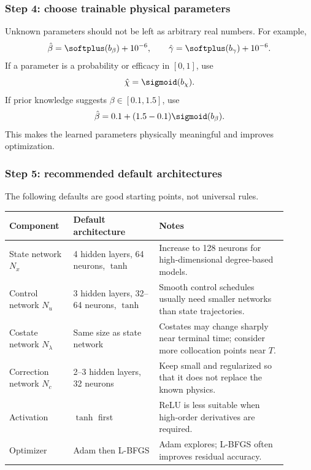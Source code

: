 \documentclass[11pt,a4paper]{article}
\begin{document}
\subsubsection*{Step 4: choose trainable physical parameters}
Unknown parameters should not be left as arbitrary real numbers. For example,
\begin{equation}
    \hat{\beta}=\softplus(b_\beta)+10^{-6},\qquad
    \hat{\gamma}=\softplus(b_\gamma)+10^{-6}.
\end{equation}
If a parameter is a probability or efficacy in $[0,1]$, use
\begin{equation}
    \hat{\chi}=\sigmoid(b_\chi).
\end{equation}
If prior knowledge suggests $\beta\in[0.1,1.5]$, use
\begin{equation}
    \hat{\beta}=0.1+(1.5-0.1)\sigmoid(b_\beta).
\end{equation}
This makes the learned parameters physically meaningful and improves optimization.

\subsubsection*{Step 5: recommended default architectures}
The following defaults are good starting points, not universal rules.
\begin{longtable}{p{0.20\linewidth}p{0.28\linewidth}p{0.42\linewidth}}
\toprule
Component & Default architecture & Notes \\
\midrule
State network $N_x$ & 4 hidden layers, 64 neurons, $\tanh$ & Increase to 128 neurons for high-dimensional degree-based models. \\
Control network $N_u$ & 3 hidden layers, 32--64 neurons, $\tanh$ & Smooth control schedules usually need smaller networks than state trajectories. \\
Costate network $N_\lambda$ & Same size as state network & Costates may change sharply near terminal time; consider more collocation points near $T$. \\
Correction network $N_c$ & 2--3 hidden layers, 32 neurons & Keep small and regularized so that it does not replace the known physics. \\
Activation & $\tanh$ first & ReLU is less suitable when high-order derivatives are required. \\
Optimizer & Adam then L-BFGS & Adam explores; L-BFGS often improves residual accuracy. \\
\bottomrule
\end{longtable}
\end{document}
